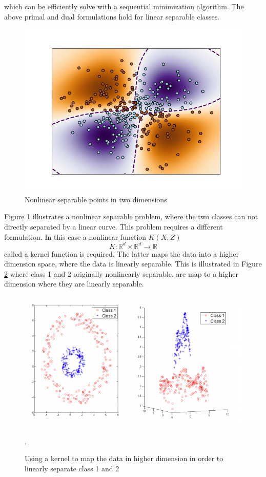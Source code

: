\documentclass[../Main/thesis.tex]{subfiles}
\begin{document}
which can be efficiently solve with a sequential minimization algorithm. The above primal and dual formulations hold for linear separable classes. \begin{figure}[H] %
   \centering
   \includegraphics[width=5in]{../fig/nonlinearsvm.png} 
   \caption{Nonlinear separable points in two dimensions}
   \label{fig:nonlinearsvm}
\end{figure}
\justify
Figure \ref{fig:nonlinearsvm} illustrates a nonlinear separable problem, where the two classes can not directly separated by a linear curve. This problem requires a different formulation. In this case a nonlinear function $K(X,Z)$
\begin{equation}
K: \mathbb{R}^{d}\times \mathbb{R}^{d} \rightarrow \mathbb{R}
\end{equation}
called a kernel function is required. The latter maps the data into a higher dimension space, where the data is linearly separable. This is illustrated in Figure \ref{fig:kernelsvm} where  class 1 and 2 originally nonlinearly separable, are map to a higher dimension where they are linearly separable.
\begin{figure}[H] %
   \centering
   \includegraphics[width=6in]{../fig/kernelsvm.png} 
   \caption{Using a kernel to map the data in higher dimension in order to linearly separate class 1 and 2}.
   \label{fig:kernelsvm}
\end{figure}
\end{document}
